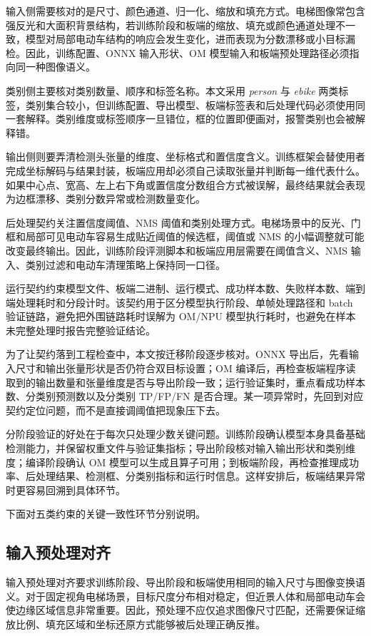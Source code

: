 输入侧需要核对的是尺寸、颜色通道、归一化、缩放和填充方式。电梯图像常包含强反光和大面积背景结构，若训练阶段和板端的缩放、填充或颜色通道处理不一致，模型对局部电动车结构的响应会发生变化，进而表现为分数漂移或小目标漏检。因此，训练配置、ONNX 输入形状、OM 模型输入和板端预处理路径必须指向同一种图像语义。

类别侧主要核对类别数量、顺序和标签名称。本文采用 \textit{person} 与 \textit{ebike} 两类标签，类别集合较小，但训练配置、导出模型、板端标签表和后处理代码必须使用同一套解释。类别维度或标签顺序一旦错位，框的位置即便画对，报警类别也会被解释错。

输出侧则要弄清检测头张量的维度、坐标格式和置信度含义。训练框架会替使用者完成坐标解码与结果封装，板端应用却必须自己读取张量并判断每一维代表什么。如果中心点、宽高、左上右下角或置信度分数组合方式被误解，最终结果就会表现为边框漂移、类别分数异常或检测数量变化。

后处理契约关注置信度阈值、NMS 阈值和类别处理方式。电梯场景中的反光、门框和局部可见电动车容易生成贴近阈值的候选框，阈值或 NMS 的小幅调整就可能改变最终输出。因此，训练阶段评测脚本和板端应用层需要在阈值含义、NMS 输入、类别过滤和电动车清理策略上保持同一口径。

运行契约约束模型文件、板端二进制、运行模式、成功样本数、失败样本数、端到端处理耗时和分段计时。该契约用于区分模型执行阶段、单帧处理路径和 batch 验证链路，避免把外围链路耗时误解为 OM/NPU 模型执行耗时，也避免在样本未完整处理时报告完整验证结论。

为了让契约落到工程检查中，本文按迁移阶段逐步核对。ONNX 导出后，先看输入尺寸和输出张量形状是否仍符合双目标设置；OM 编译后，再检查板端程序读取到的输出数量和张量维度是否与导出阶段一致；运行验证集时，重点看成功样本数、分类别预测数以及分类别 TP/FP/FN 是否合理。某一项异常时，先回到对应契约定位问题，而不是直接调阈值把现象压下去。

分阶段验证的好处在于每次只处理少数关键问题。训练阶段确认模型本身具备基础检测能力，并保留权重文件与验证集指标；导出阶段核对输入输出形状和类别维度；编译阶段确认 OM 模型可以生成且算子可用；到板端阶段，再检查推理成功率、后处理结果、检测框、分类别指标和运行时信息。这样安排后，板端结果异常时更容易回溯到具体环节。

下面对五类约束的关键一致性环节分别说明。

\subsection{输入预处理对齐}

输入预处理对齐要求训练阶段、导出阶段和板端使用相同的输入尺寸与图像变换语义。对于固定视角电梯场景，目标尺度分布相对稳定，但近景人体和局部电动车会使边缘区域信息非常重要。因此，预处理不应仅追求图像尺寸匹配，还需要保证缩放比例、填充区域和坐标还原方式能够被后处理正确反推。

